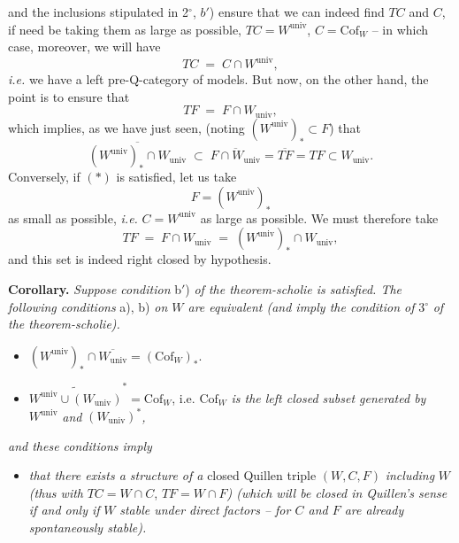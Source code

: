 \documentclass[11pt]{article}
\newcommand{\printedpage}[1]{\marginpar{\footnotesize p.~#1}}
\newcommand{\msp}[1]{\marginpar{\footnotesize [#1]}}
\newcommand{\univ}{\mathrm{univ}}
\newcommand{\Cof}{\mathrm{Cof}}
\newcommand{\cercle}[1]{\mbox{\tikz[baseline=(c.base)]\node[draw,circle,inner sep=1pt](c){#1};}}
\begin{document}
\printedpage{14}

\msp{page 24}
\noindent and the inclusions stipulated in 2$^\circ$, $b'$) ensure that we can indeed find $TC$ and $C$, if need be taking them as large as possible, $TC = W^{\univ}$, $C = \Cof_W$ -- in which case, moreover, we will have
\[
TC \;=\; C \cap W^{\univ},
\]
\textit{i.e.} we have a left pre-Q-category of models. But now, on the other hand, the point is to ensure that
\[
TF \;=\; F \cap W_{\univ},
\]
which implies, as we have just seen, (noting $(W^{\univ})_* \subset F$) that
\[
\overline{(W^{\univ})_* \cap W_{\univ}} \;\subset\; \overline{F \cap W_{\univ}} = \overline{TF} = TF \subset W_{\univ}. \tag*{$(*)$}
\]
Conversely, if $(*)$ is satisfied, let us take
\[
F = (W^{\univ})_*
\]
as small as possible, \textit{i.e.} $C = W^{\univ}$ as large as possible. We must therefore take
\[
TF \;=\; F \cap W_{\univ} \;=\; (W^{\univ})_* \cap W_{\univ},
\]
and this set is indeed right closed by hypothesis.

\textbf{Corollary.} \textit{Suppose condition} b$'$) \textit{of the theorem-scholie is satisfied. The following conditions} a), b) \textit{on $W$ are equivalent (and imply the condition of} 3$^\circ$ \textit{of the theorem-scholie).}

\msp{page 25}
\begin{itemize}[leftmargin=3em]
\item[\cercle{a}] $(W^{\univ})_* \cap \overline{W_{\univ}} = (\Cof_W)_*$.

\item[\cercle{b}] $\widetilde{W^{\univ} \cup (W_{\univ})}^{*} = \Cof_W$, i.e. $\Cof_W$ \textit{is the left closed subset generated by} $W^{\univ}$ \textit{and} $(W_{\univ})^*$\textit{,} %
\end{itemize}

\noindent\textit{and these conditions imply}

\begin{itemize}[leftmargin=3em]
\item[\cercle{c}] \textit{that there exists a structure of a} closed Quillen triple $(W, C, F)$ \textit{including} $W$ \textit{(thus with} $TC = W \cap C$, $TF = W \cap F$\textit{) (which will be closed in Quillen's sense if and only if} $W$ \textit{stable under direct factors -- for $C$ and $F$ are already spontaneously stable).}
\end{itemize}
\end{document}
